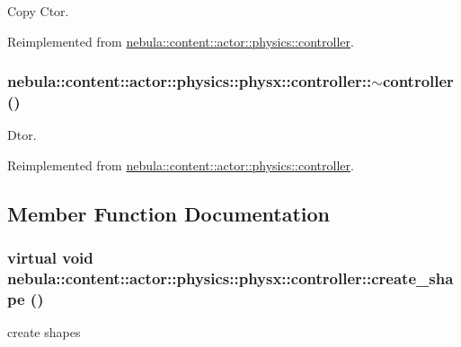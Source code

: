 Copy Ctor. 

Reimplemented from \hyperlink{classnebula_1_1content_1_1actor_1_1physics_1_1controller_acea67f469fce95ed2a27fe062aea026a}{nebula::content::actor::physics::controller}.\hypertarget{classnebula_1_1content_1_1actor_1_1physics_1_1physx_1_1controller_a5703a3258866685338b218c9fbc32c83}{
\subsubsection[{$\sim$controller}]{\setlength{\rightskip}{0pt plus 5cm}nebula::content::actor::physics::physx::controller::$\sim$controller ()}}
\label{classnebula_1_1content_1_1actor_1_1physics_1_1physx_1_1controller_a5703a3258866685338b218c9fbc32c83}


Dtor. 

Reimplemented from \hyperlink{classnebula_1_1content_1_1actor_1_1physics_1_1controller_ae2e6459aa8fafd45c7a1f18a1906d418}{nebula::content::actor::physics::controller}.

\subsection{Member Function Documentation}
\hypertarget{classnebula_1_1content_1_1actor_1_1physics_1_1physx_1_1controller_a564978bb4826a13f31d59e474d4cd48e}{
\subsubsection[{create\_\-shape}]{\setlength{\rightskip}{0pt plus 5cm}virtual void nebula::content::actor::physics::physx::controller::create\_\-shape ()}}
\label{classnebula_1_1content_1_1actor_1_1physics_1_1physx_1_1controller_a564978bb4826a13f31d59e474d4cd48e}


create shapes 

